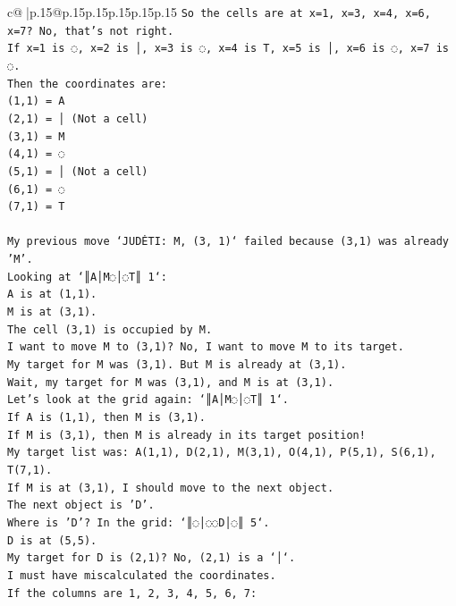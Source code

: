\documentclass{article}
\begin{document}
{\begin{supertabular}{c@{$\;$}|p{.15\linewidth}@{}p{.15\linewidth}p{.15\linewidth}p{.15\linewidth}p{.15\linewidth}p{.15\linewidth}}
{{{\texttt{So the cells are at x=1, x=3, x=4, x=6, x=7? No, that's not right.} \\
\texttt{If x=1 is ◌, x=2 is │, x=3 is ◌, x=4 is T, x=5 is │, x=6 is ◌, x=7 is ◌.} \\
\texttt{Then the coordinates are:} \\
\texttt{(1,1) = A} \\
\texttt{(2,1) = │ (Not a cell)} \\
\texttt{(3,1) = M} \\
\texttt{(4,1) = ◌} \\
\texttt{(5,1) = │ (Not a cell)} \\
\texttt{(6,1) = ◌} \\
\texttt{(7,1) = T} \\
\\ 
\texttt{My previous move `JUDĖTI: M, (3, 1)` failed because (3,1) was already 'M'.} \\
\texttt{Looking at `║A│M◌│◌T║ 1`:} \\
\texttt{A is at (1,1).} \\
\texttt{M is at (3,1).} \\
\texttt{The cell (3,1) is occupied by M.} \\
\texttt{I want to move M to (3,1)? No, I want to move M to its target.} \\
\texttt{My target for M was (3,1). But M is already at (3,1).} \\
\texttt{Wait, my target for M was (3,1), and M is at (3,1).} \\
\texttt{Let's look at the grid again: `║A│M◌│◌T║ 1`.} \\
\texttt{If A is (1,1), then M is (3,1).} \\
\texttt{If M is (3,1), then M is already in its target position!} \\
\texttt{My target list was: A(1,1), D(2,1), M(3,1), O(4,1), P(5,1), S(6,1), T(7,1).} \\
\texttt{If M is at (3,1), I should move to the next object.} \\
\texttt{The next object is 'D'.} \\
\texttt{Where is 'D'? In the grid: `║◌│◌◌D│◌║ 5`.} \\
\texttt{D is at (5,5).} \\
\texttt{My target for D is (2,1)? No, (2,1) is a `│`.} \\
\texttt{I must have miscalculated the coordinates.} \\
\texttt{If the columns are 1, 2, 3, 4, 5, 6, 7:} \\
}}}
\end{supertabular}}
\end{document}
